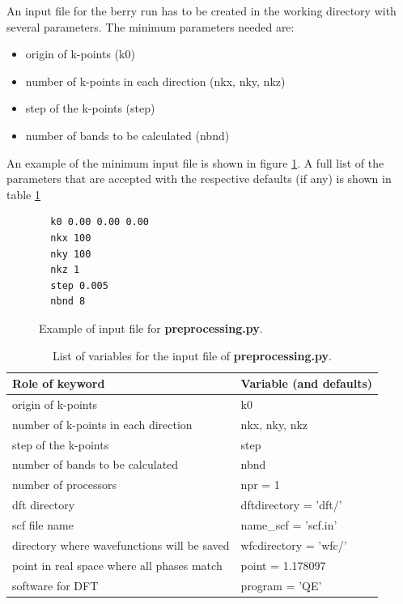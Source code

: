 \documentclass[a4paper,12pt]{report}
\begin{document}
 An input file for the berry run has to be created in the working directory with several parameters.
The minimum parameters needed are:
\begin{itemize}
 \item origin of k-points (k0)
 \item number of k-points in each direction (nkx, nky, nkz)
 \item step of the k-points (step)
 \item number of bands to be calculated (nbnd)
\end{itemize}

An example of the minimum input file is shown in figure \ref{code:inputfile}.
A full list of the parameters that are accepted with the respective defaults (if any)
is shown in table \ref{tab:variables_preprocessing}

\begin{figure}[h]
 \centering\caption{Example of input file for \textbf{preprocessing.py}.}
\begin{verbatim}
  k0 0.00 0.00 0.00
  nkx 100
  nky 100
  nkz 1
  step 0.005
  nbnd 8
\end{verbatim}
\label{code:inputfile}
\end{figure}



\begin{table}[h]
 \centering
 \caption{List of variables for the input file of \textbf{preprocessing.py}.}

 \begin{tabularx}{\textwidth}{Xl}
 \textbf{Role of keyword}  & \textbf{Variable (and defaults)}\\
\hline
 origin of k-points  & k0 \\
 number of k-points in each direction  & nkx, nky, nkz \\
 step of the k-points  & step \\
 number of bands to be calculated  & nbnd \\
 \hline
 number of processors  & npr = 1 \\
 dft directory  & dftdirectory = 'dft/' \\
 scf file name  &     name\_scf = 'scf.in' \\
 directory where wavefunctions will be saved  &     wfcdirectory = 'wfc/' \\
 point in real space where all phases match  & point = 1.178097 \\
 software for DFT  &  program = 'QE' \\
 \hline
\end{tabularx}
 \label{tab:variables_preprocessing}
\end{table}
\end{document}
